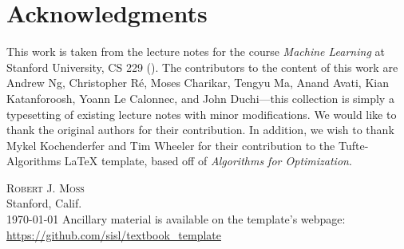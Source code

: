 \chapter*{Acknowledgments}

This work is taken from the lecture notes for the course \textit{Machine Learning} at Stanford University, CS 229 (). %
The contributors to the content of this work are Andrew Ng, Christopher R\'e, Moses Charikar, Tengyu Ma, Anand Avati, Kian Katanforoosh, Yoann Le Calonnec, and John Duchi---this collection is simply a typesetting of existing lecture notes with minor modifications. We would like to thank the original authors for their contribution.
In addition, we wish to thank Mykel Kochenderfer and Tim Wheeler for their contribution to the Tufte-Algorithms \LaTeX{} template, based off of \textit{Algorithms for Optimization}.\cite{Kochenderfer2019}




\vspace{5ex}
\noindent\textsc{Robert J. Moss}\\
Stanford, Calif.\\
\psetdate\today
\vfill
\noindent Ancillary material is available on the template's webpage:\\
\noindent\url{https://github.com/sisl/textbook_template}
